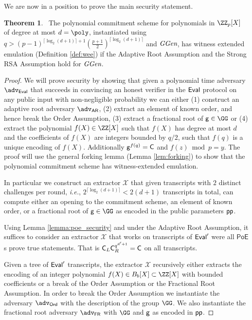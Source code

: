 \documentclass{article}
\theoremstyle{definition}
\newtheorem{theorem}{Theorem}
\begin{document}
We are now in a position to prove the main security statement.

\begin{theorem}~\label{thm:polycommitsecurity} 
	The polynomial commitment scheme for polynomials in $\ZZ_p[X]$ of degree at most $d=\poly$, instantiated using $q>(p-1)^{\lceil \log_2(d+1)\rceil+1}(\frac{p+1}{2})^{\lceil \log_2(d+1)\rceil}$ and $\textit{GGen}$, has witness extended emulation (Definition \ref{def:wee}) if the Adaptive Root Assumption and the Strong RSA Assumption hold for $\textit{GGen}$.
\end{theorem}

\begin{proof}
We will prove security by showing that given a polynomial time adversary $\adv_{\eval}$ that succeeds in convincing an honest verifier in the $\textsf{{Eval}}$ protocol on any public input with non-negligible probability we can either (1) construct an adaptive root adversary $\adv_{\textsf{AR}}$, (2) extract an element of known order, and hence break the Order Assumption, (3) extract a fractional root of $\gr{g}\in \GG$ or (4) extract the polynomial $f(X)\in \ZZ[X]$ such that $f(X)$ has degree at most $d$ and the coefficients of $f(X)$ are integers bounded by $q/2$, such that $f(q)$ is a unique encoding of $f(X)$. Additionally $\mathsf{g}^{f(q)}=\mathsf{C}$ and $f(z) \bmod p=y$. The proof will use the general forking lemma (Lemma \ref{lem:forking}) to show that the polynomial commitment scheme has witness-extended emulation.

In particular we construct an extractor $\mathcal{X}$ that given transcripts with $2$ distinct challenges per round, \emph{i.e.}, $2^{\lceil\log_2(d+1)\rceil}<2 (d+1)$ transcripts in total, can compute either an opening to the commitment scheme, an element of known order, or a fractional root of $\gr{g}\in\GG$ as encoded in the public parameters $\textsf{pp}$.

Using Lemma \ref{lemma:poe_security} and under the Adaptive Root Assumption, it suffices to consider an extractor $\mathcal{X}$ that works on transcripts of $\textsf{{Eval}}'$ were all $\textsf{PoE}$s prove true statements. That is $\mathsf{C}_L\mathsf{C}_R^{q^{d'+1}}=\mathsf{C}$ on all transcripts.

Given a tree of $\textsf{{Eval}}'$ transcripts, the extractor $\mathcal{X}$ recursively either extracts the encoding of an integer polynomial $f(X)\in B_b[X]\subset \ZZ[X]$ with bounded coefficients or a break of the Order Assumption or the Fractional Root Assumption. 
In order to break the Order Assumption we instantiate the adversary $\adv_{\textsf{Ord}}$ with the description of the group $\GG$. We also instantiate the fractional root adversary $\adv_{\textsf{FR}}$ with $\GG$ and $\mathsf{g}$ as encoded in $\textsf{pp}$.


\end{proof}
\end{document}

